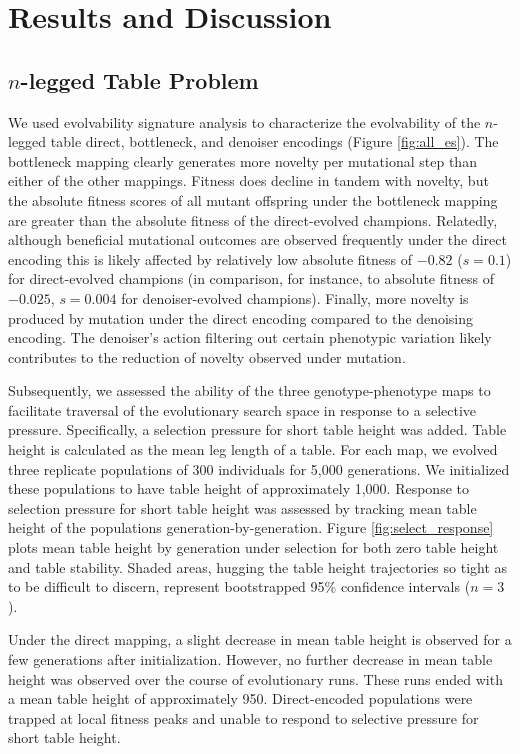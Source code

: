 \section{Results and Discussion} \label{sec:results}

\subsection{$n$-legged Table Problem}



We used evolvability signature analysis to characterize the evolvability of the $n$-legged table direct, bottleneck, and denoiser encodings (Figure \ref{fig:all_es}).
The bottleneck mapping clearly generates more novelty per mutational step than either of the other mappings.
Fitness does decline in tandem with novelty, but the absolute fitness scores of all mutant offspring under the bottleneck mapping are greater than the absolute fitness of the direct-evolved champions.
Relatedly, although beneficial mutational outcomes are observed frequently under the direct encoding this is likely affected by relatively low absolute fitness of $-0.82$ ($s=0.1$) for direct-evolved champions (in comparison, for instance, to absolute fitness of $-0.025$, $s=0.004$ for denoiser-evolved champions).
Finally, more novelty is produced by mutation under the direct encoding compared to the denoising encoding.
The denoiser's action filtering out certain phenotypic variation likely contributes to the reduction of novelty observed under mutation.

Subsequently, we assessed the ability of the three genotype-phenotype maps to facilitate traversal of the evolutionary search space in response to a selective pressure.
Specifically, a selection pressure for short table height was added.
Table height is calculated as the mean leg length of a table.
For each map, we evolved three replicate populations of 300 individuals for 5,000 generations.
We initialized these populations to have table height of approximately 1,000.
Response to selection pressure for short table height was assessed by tracking mean table height of the populations generation-by-generation.
Figure \ref{fig:select_response} plots mean table height by generation under selection for both zero table height and table stability.
Shaded areas, hugging the table height trajectories so tight as to be difficult to discern, represent bootstrapped 95\% confidence intervals ($n=3$).

Under the direct mapping, a slight decrease in mean table height is observed for a few generations after initialization.
However, no further decrease in mean table height was observed over the course of evolutionary runs.
These runs ended with a mean table height of approximately 950.
Direct-encoded populations were trapped at local fitness peaks and unable to respond to selective pressure for short table height.

